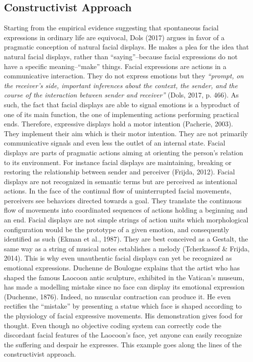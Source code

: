 \documentclass[man]{apa6}
\begin{document}
\hypertarget{constructivist-approach}{%
\subsection{Constructivist Approach}\label{constructivist-approach}}

Starting from the empirical evidence suggesting that spontaneous facial expressions in ordinary life are equivocal, Dols (2017) argues in favor of a pragmatic conception of natural facial displays. He makes a plea for the idea that natural facial displays, rather than \enquote{saying}--because facial expressions do not have a specific meaning--\enquote{make} things. Facial expressions are actions in a communicative interaction. They do not express emotions but they \emph{\enquote{prompt, on the receiver's side, important inferences about the context, the sender, and the course of the interaction between sender and receiver}} (Dols, 2017, p. 466). As such, the fact that facial displays are able to signal emotions is a byproduct of one of its main function, the one of implementing actions performing practical ends. Therefore, expressive displays hold a motor intention (Pacherie, 2003). They implement their aim which is their motor intention. They are not primarily communicative signals and even less the outlet of an internal state. Facial displays are parts of pragmatic actions aiming at orienting the person's relation to its environment. For instance facial displays are maintaining, breaking or restoring the relationship between sender and perceiver (Frijda, 2012). Facial displays are not recognized in semantic terms but are perceived as intentional actions. In the face of the continual flow of uninterrupted facial movements, perceivers see behaviors directed towards a goal. They translate the continuous flow of movements into coordinated sequences of actions holding a beginning and an end. Facial displays are not simple strings of action units which morphological configuration would be the prototype of a given emotion, and consequently identified as such (Ekman et al., 1987). They are best conceived as a Gestalt, the same way as a string of musical notes establishes a melody (Tcherkassof \& Frijda, 2014). This is why even unauthentic facial displays can yet be recognized as emotional expressions. Duchenne de Boulogne explains that the artist who has shaped the famous Laocoon antic sculpture, exhibited in the Vatican's museum, has made a modelling mistake since no face can display its emotional expression (Duchenne, 1876). Indeed, no muscular contraction can produce it. He even rectifies the \enquote{mistake} by presenting a statue which face is shaped according to the physiology of facial expressive movements. His demonstration gives food for thought. Even though no objective coding system can correctly code the discordant facial features of the Laocoon's face, yet anyone can easily recognize the suffering and despair he expresses. This example goes along the lines of the constructivist approach.
\end{document}
